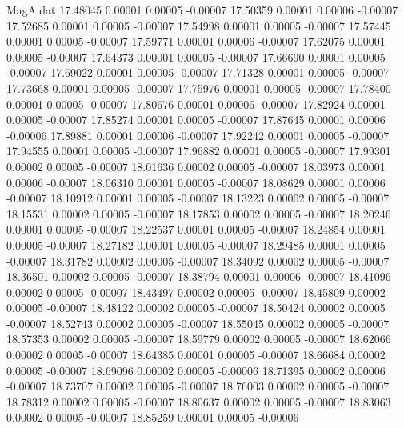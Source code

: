 \begin{filecontents}{MagA.dat}
  17.48045    0.00001    0.00005   -0.00007
  17.50359    0.00001    0.00006   -0.00007
  17.52685    0.00001    0.00005   -0.00007
  17.54998    0.00001    0.00005   -0.00007
  17.57445    0.00001    0.00005   -0.00007
  17.59771    0.00001    0.00006   -0.00007
  17.62075    0.00001    0.00005   -0.00007
  17.64373    0.00001    0.00005   -0.00007
  17.66690    0.00001    0.00005   -0.00007
  17.69022    0.00001    0.00005   -0.00007
  17.71328    0.00001    0.00005   -0.00007
  17.73668    0.00001    0.00005   -0.00007
  17.75976    0.00001    0.00005   -0.00007
  17.78400    0.00001    0.00005   -0.00007
  17.80676    0.00001    0.00006   -0.00007
  17.82924    0.00001    0.00005   -0.00007
  17.85274    0.00001    0.00005   -0.00007
  17.87645    0.00001    0.00006   -0.00006
  17.89881    0.00001    0.00006   -0.00007
  17.92242    0.00001    0.00005   -0.00007
  17.94555    0.00001    0.00005   -0.00007
  17.96882    0.00001    0.00005   -0.00007
  17.99301    0.00002    0.00005   -0.00007
  18.01636    0.00002    0.00005   -0.00007
  18.03973    0.00001    0.00006   -0.00007
  18.06310    0.00001    0.00005   -0.00007
  18.08629    0.00001    0.00006   -0.00007
  18.10912    0.00001    0.00005   -0.00007
  18.13223    0.00002    0.00005   -0.00007
  18.15531    0.00002    0.00005   -0.00007
  18.17853    0.00002    0.00005   -0.00007
  18.20246    0.00001    0.00005   -0.00007
  18.22537    0.00001    0.00005   -0.00007
  18.24854    0.00001    0.00005   -0.00007
  18.27182    0.00001    0.00005   -0.00007
  18.29485    0.00001    0.00005   -0.00007
  18.31782    0.00002    0.00005   -0.00007
  18.34092    0.00002    0.00005   -0.00007
  18.36501    0.00002    0.00005   -0.00007
  18.38794    0.00001    0.00006   -0.00007
  18.41096    0.00002    0.00005   -0.00007
  18.43497    0.00002    0.00005   -0.00007
  18.45809    0.00002    0.00005   -0.00007
  18.48122    0.00002    0.00005   -0.00007
  18.50424    0.00002    0.00005   -0.00007
  18.52743    0.00002    0.00005   -0.00007
  18.55045    0.00002    0.00005   -0.00007
  18.57353    0.00002    0.00005   -0.00007
  18.59779    0.00002    0.00005   -0.00007
  18.62066    0.00002    0.00005   -0.00007
  18.64385    0.00001    0.00005   -0.00007
  18.66684    0.00002    0.00005   -0.00007
  18.69096    0.00002    0.00005   -0.00006
  18.71395    0.00002    0.00006   -0.00007
  18.73707    0.00002    0.00005   -0.00007
  18.76003    0.00002    0.00005   -0.00007
  18.78312    0.00002    0.00005   -0.00007
  18.80637    0.00002    0.00005   -0.00007
  18.83063    0.00002    0.00005   -0.00007
  18.85259    0.00001    0.00005   -0.00006

\end{filecontents}
